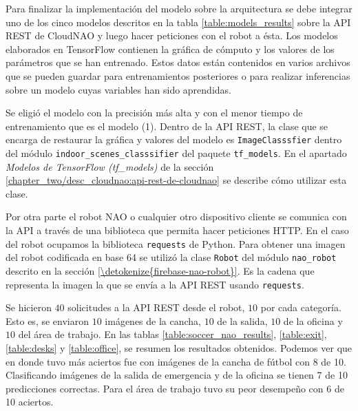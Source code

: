 Para finalizar la implementación del modelo sobre la arquitectura
se debe integrar uno de los cinco modelos descritos en la tabla \ref{table:models_results} sobre la API REST de CloudNAO y luego hacer peticiones con el robot a ésta.
Los modelos elaborados en TensorFlow contienen la gráfica de cómputo
y los valores de los parámetros que se han entrenado. Estos datos
están contenidos en varios archivos que se pueden guardar para
entrenamientos posteriores o para realizar inferencias sobre 
un modelo cuyas variables han sido aprendidas.

Se eligió el modelo con la precisión más alta y con el menor
tiempo de entrenamiento que es el modelo (1). 
Dentro de la API REST, la clase que se encarga de restaurar la gráfica y valores del modelo
es \texttt{ImageClasssfier} dentro del módulo \texttt{indoor\_scenes\_classsifier} del paquete \texttt{tf\_models}.
En el apartado \textit{Modelos de TensorFlow (tf\_models)}
de la sección \ref{chapter_two/desc_cloudnao:api-rest-de-cloudnao}
se describe cómo utilizar esta clase.

Por otra parte el robot NAO o cualquier otro
dispositivo cliente se comunica con la API a través
de una biblioteca que permita hacer peticiones 
HTTP. En el caso del robot ocupamos la biblioteca
\texttt{requests} de Python. Para obtener una imagen 
del robot codificada en base 64 se utilizó la clase \texttt{Robot}
del módulo \texttt{nao\_robot} descrito en la sección
\ref{\detokenize{firebase-nao-robot}}. Es la cadena
que representa la imagen la que se envía a la API REST usando
\texttt{requests}.

Se hicieron $40$ solicitudes a la API REST desde el robot,
$10$ por cada categoría. Esto es, se enviaron
$10$ imágenes de la cancha, $10$ de la salida,
$10$ de la oficina y $10$ del área de trabajo.
En las tablas \ref{table:soccer_nao_results},
\ref{table:exit}, \ref{table:desks} y
\ref{table:office}, se resumen los resultados obtenidos.
Podemos ver que en donde tuvo más aciertos fue 
con imágenes de la cancha de fútbol con 8 de 10.
Clasificando imágenes de la salida de emergencia
y de la oficina se tienen 7 de 10 predicciones correctas.
Para el área de trabajo tuvo su peor desempeño con 6 de
10 aciertos.


